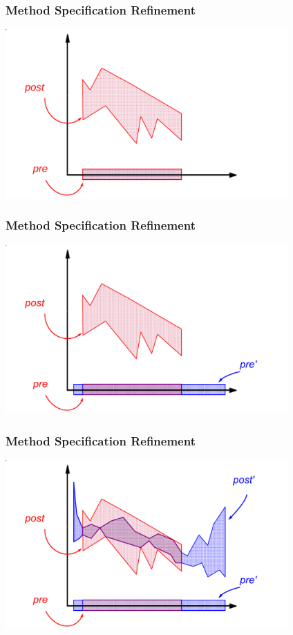\begin{frame}
\frametitle{Method Specification Refinement}
\includegraphics[width=4.25in]{meth-refine1}
\end{frame}

\begin{frame}
\frametitle{Method Specification Refinement}
\transdissolve[duration=0.2]
\includegraphics[width=4.25in]{meth-refine2}
\end{frame}

\begin{frame}
\frametitle{Method Specification Refinement}
\transdissolve[duration=0.2]
\includegraphics[width=4.25in]{meth-refine3}
\end{frame}

